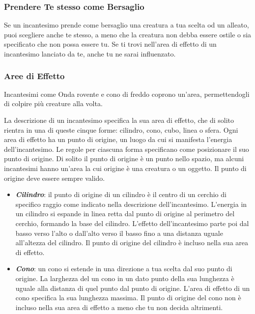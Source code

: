 \begin{multicols}{2}
\subsubsection*{Prendere Te stesso come Bersaglio}

Se un incantesimo prende come bersaglio una creatura a tua scelta od un alleato, puoi scegliere anche te stesso, a meno che la creatura non debba essere ostile o sia specificato che non possa essere tu. Se ti trovi nell'area di effetto di un incantesimo lanciato da te, anche tu ne sarai influenzato.

\subsubsection{Aree di Effetto}\label{magieareedieffetto}

Incantesimi come Onda rovente e cono di freddo coprono un'area, permettendogli di colpire più creature alla volta.

La descrizione di un incantesimo specifica la sua area di effetto, che di solito rientra in una di queste cinque forme: cilindro, cono, cubo, linea o sfera. Ogni area di effetto ha un punto di origine, un luogo da cui si manifesta l'energia dell'incantesimo. Le regole per ciascuna forma specificano come posizionare il suo punto di origine. Di solito il punto di origine è un punto nello spazio, ma alcuni incantesimi hanno un'area la cui origine è una creatura o un oggetto. Il punto di origine deve essere sempre valido.

\begin{itemize}[leftmargin=*] \setlength{\itemsep}{0pt}
\item \emph{\textbf{Cilindro}}: il punto di origine di un cilindro è il centro di un cerchio di specifico raggio come indicato nella descrizione dell'incantesimo. L'energia in un cilindro si espande in linea retta dal punto di origine al perimetro del cerchio, formando la base del cilindro. L'effetto dell'incantesimo parte poi dal basso verso l'alto o dall'alto verso il basso fino a una distanza uguale all'altezza del cilindro. Il punto di origine del cilindro è incluso nella sua area di effetto.

\item \emph{\textbf{Cono}}: un cono si estende in una direzione a tua scelta dal suo punto di origine. La larghezza del un cono in un dato punto della sua lunghezza è uguale alla distanza di quel punto dal punto di origine. L'area di effetto di un cono specifica la sua lunghezza massima. Il punto di origine del cono non è incluso nella sua area di effetto a meno che tu non decida altrimenti.


\end{itemize}
\end{multicols}
